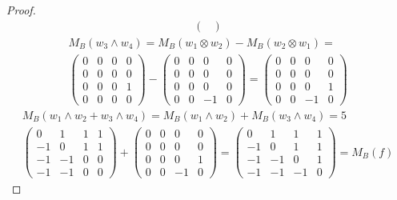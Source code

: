 \documentclass[12pt]{article}
\theoremstyle{break}
\newtheorem*{proof}{Demostración}
\begin{document}
\begin{proof}
\begin{gather*}
\begin{pmatrix}
		\end{pmatrix}
	\end{gather*}
	\begin{gather*}
		M_B(w_3\wedge w_4) = M_B(w_1 \otimes w_2) - M_B(w_2 \otimes w_1)= \\ \begin{pmatrix}
			0 & 0 & 0 & 0 \\ 0 & 0 & 0 & 0 \\ 0 & 0 & 0 & 1 \\ 0 & 0 & 0 & 0
		\end{pmatrix} - \begin{pmatrix}
			0 & 0 & 0 & 0 \\ 0 & 0 & 0 & 0 \\ 0 & 0 & 0 & 0 \\ 0 & 0 & -1 & 0
		\end{pmatrix} = \begin{pmatrix}
			0 & 0 & 0 & 0 \\ 0 & 0 & 0 & 0 \\ 0 & 0 & 0 & 1 \\ 0 & 0 & -1 & 0
		\end{pmatrix}
	\end{gather*}
	\begin{gather*}
		M_B(w_1 \wedge w_2 + w_3\wedge w_4) = M_B(w_1 \wedge w_2) + M_B(w_3 \wedge w_4)= 5\\ \begin{pmatrix}
			0 & 1 & 1 & 1 \\ -1 & 0 & 1 & 1 \\ -1 & -1 & 0 & 0 \\ -1 & -1 & 0 & 0
		\end{pmatrix} + \begin{pmatrix}
			0 & 0 & 0 & 0 \\ 0 & 0 & 0 & 0 \\ 0 & 0 & 0 & 1 \\ 0 & 0 & -1 & 0
		\end{pmatrix} = \begin{pmatrix}
			0 & 1 & 1 & 1 \\ -1 & 0 & 1 & 1 \\ -1 & -1 & 0 & 1 \\ -1 & -1 & -1 & 0
		\end{pmatrix} = M_B(f)
	\end{gather*}
\end{proof}
\end{document}
